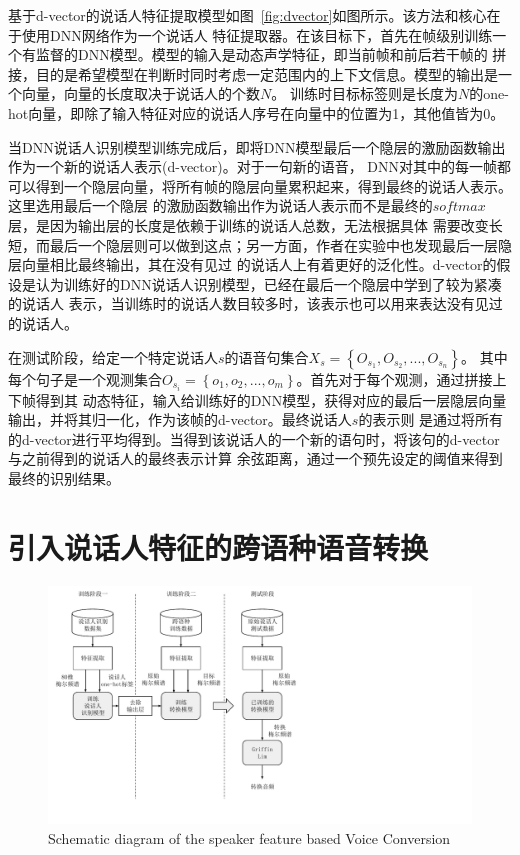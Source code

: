 基于d-vector的说话人特征提取模型如图~\ref{fig:dvector}如图所示。该方法和核心在于使用DNN网络作为一个说话人
特征提取器。在该目标下，首先在帧级别训练一个有监督的DNN模型。模型的输入是动态声学特征，即当前帧和前后若干帧的
拼接，目的是希望模型在判断时同时考虑一定范围内的上下文信息。模型的输出是一个向量，向量的长度取决于说话人的个数$N$。
训练时目标标签则是长度为$N$的one-hot向量，即除了输入特征对应的说话人序号在向量中的位置为1，其他值皆为0。

当DNN说话人识别模型训练完成后，即将DNN模型最后一个隐层的激励函数输出作为一个新的说话人表示(d-vector)。对于一句新的语音，
DNN对其中的每一帧都可以得到一个隐层向量，将所有帧的隐层向量累积起来，得到最终的说话人表示。这里选用最后一个隐层
的激励函数输出作为说话人表示而不是最终的$softmax$层，是因为输出层的长度是依赖于训练的说话人总数，无法根据具体
需要改变长短，而最后一个隐层则可以做到这点；另一方面，作者在实验中也发现最后一层隐层向量相比最终输出，其在没有见过
的说话人上有着更好的泛化性。d-vector的假设是认为训练好的DNN说话人识别模型，已经在最后一个隐层中学到了较为紧凑的说话人
表示，当训练时的说话人数目较多时，该表示也可以用来表达没有见过的说话人。

在测试阶段，给定一个特定说话人$s$的语音句集合$X_s = \left\{O_{s_{1}},O_{s_{2}},...,O_{s_{n}}\right\}$。
其中每个句子是一个观测集合$O_{s_{i}} = \left\{o_1,o_2,...,o_m\right\}$。首先对于每个观测，通过拼接上下帧得到其
动态特征，输入给训练好的DNN模型，获得对应的最后一层隐层向量输出，并将其归一化，作为该帧的d-vector。最终说话人$s$的表示则
是通过将所有的d-vector进行平均得到。当得到该说话人的一个新的语句时，将该句的d-vector与之前得到的说话人的最终表示计算
余弦距离，通过一个预先设定的阈值来得到最终的识别结果。

\section{引入说话人特征的跨语种语音转换}

\begin{figure}[!htp]
    \centering
    \includegraphics[width=12cm,trim=0 50 250 0,clip]{figure/5_proposedarch.pdf}
    {Schematic diagram of the speaker feature based Voice Conversion}
    \label{fig:5proposedarch}
\end{figure}

